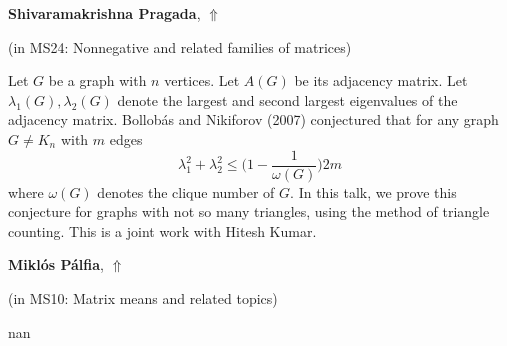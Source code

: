 \documentclass[ILAS2025-program.tex]{subfiles}
\begin{document}
\hypertarget{down0199}{}\begin{ilasabstract}
    
\textbf{Shivaramakrishna Pragada},  \hfill \hyperlink{up0199}{$\Uparrow$}
    
    
(in {\color{mstitle}MS24: Nonnegative and related families of matrices})
        
\mtskip
    Let $G$ be a graph with $n$ vertices. Let $A(G)$ be its adjacency matrix. Let $\lambda_1(G), \lambda_2(G)$ denote the largest and second largest eigenvalues of the adjacency matrix. Bollob\'{a}s and Nikiforov (2007) conjectured that for any graph $G \neq K_n$ with $m$ edges
\[\lambda_1^2+\lambda_2^2\le \bigg( 1-\frac{1}{\omega(G)}\bigg)2m\]
where $\omega(G)$ denotes the clique number of $G$. In this talk, we prove this conjecture for graphs with not so many triangles, using the method of triangle counting. This is a joint work with Hitesh Kumar.

\end{ilasabstract}
    

\hypertarget{down0132}{}\begin{ilasabstract}
    
\textbf{Miklós Pálfia},  \hfill \hyperlink{up0132}{$\Uparrow$}
    
    
(in {\color{mstitle}MS10: Matrix means and related topics})
        
\mtskip
    nan
\end{ilasabstract}
    
\end{document}

